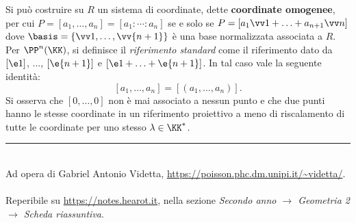 \documentclass[10pt,landscape]{article}
\begin{document}
\begin{multicols}{3}
		
		Si può costruire su $R$ un sistema di coordinate, dette \textbf{coordinate omogenee},
		per cui $P = [a_1, \ldots, a_n] = [a_1 : \cdots : a_n]$ se e solo se
		$P = [a_1 \vv 1 + \ldots + a_{n+1} \vv n]$ dove $\basis = \{\vv 1, \ldots, \vv{n+1}\}$
		è una base normalizzata associata a $R$. Per $\PP^n(\KK)$, si definisce il
		\textit{riferimento standard} come il riferimento dato da
		$[\e1]$, ..., $[\e{n+1}]$ e $[\e1 + \ldots + \e{n+1}]$. In tal caso vale
		la seguente identità:
		\[ [a_1, \ldots, a_n] = [(a_1, \ldots, a_n)]. \]
		Si osserva che $[0, \ldots, 0]$ non è mai associato a nessun punto e che due punti
		hanno le stesse coordinate in un riferimento proiettivo a meno di riscalamento
		di tutte le coordinate per uno stesso $\lambda \in \KK^*$.
		
		\vfill
		\hrule
		~\\
		Ad opera di Gabriel Antonio Videtta, \url{https://poisson.phc.dm.unipi.it/~videtta/}.
		~\\Reperibile su
		\url{https://notes.hearot.it}, nella sezione \textit{Secondo anno $\to$ Geometria 2 $\to$ Scheda riassuntiva}.
	\end{multicols}
	
\end{document}
